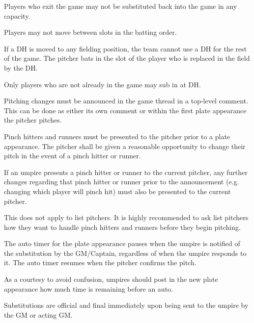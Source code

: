 \begin{deepEnumerate}
\begin{deepEnumerate}
\begin{deepEnumerate}
			\begin{deepEnumerate}
				\item Players who exit the game may not be substituted back into the game in any capacity.
				\item Players may not move between slots in the batting order.
				\item If a DH is moved to any fielding position, the team cannot use a DH for the rest of the game. 
				The pitcher bats in the slot of the player who is replaced in the field by the DH.
				\item Only players who are not already in the game may sub in at DH.
			\end{deepEnumerate}
		\end{deepEnumerate}
		\item Pitching changes must be announced in the game thread in a top-level comment.  
		This can be done as either its own comment or within the first plate appearance the pitcher pitches.
		\item Pinch hitters and runners must be presented to the pitcher prior to a plate appearance. 
		The pitcher shall be given a reasonable opportunity to change their pitch in the event of a pinch hitter or runner.
		\begin{deepEnumerate}
			\item If an umpire presents a pinch hitter or runner to the current pitcher, any further changes regarding that pinch hitter or runner prior to the announcement 
			(e.g. changing which player will pinch hit) must also be presented to the current pitcher.
			\item This does not apply to list pitchers. It is highly recommended to ask list pitchers how they want to handle pinch hitters and runners before they begin pitching.
			\item The auto timer for the plate appearance pauses when the umpire is notified of the substitution by the GM/Captain, 
			regardless of when the umpire responds to it. The auto timer resumes when the pitcher confirms the pitch.
			\begin{deepEnumerate}
				\item As a courtesy to avoid confusion, umpires should post in the new plate appearance how much time is remaining before an auto.
			\end{deepEnumerate}
		\end{deepEnumerate}
		\item Substitutions are official and final immediately upon being sent to the umpire by the GM or acting GM.

\end{deepEnumerate}
\end{deepEnumerate}
